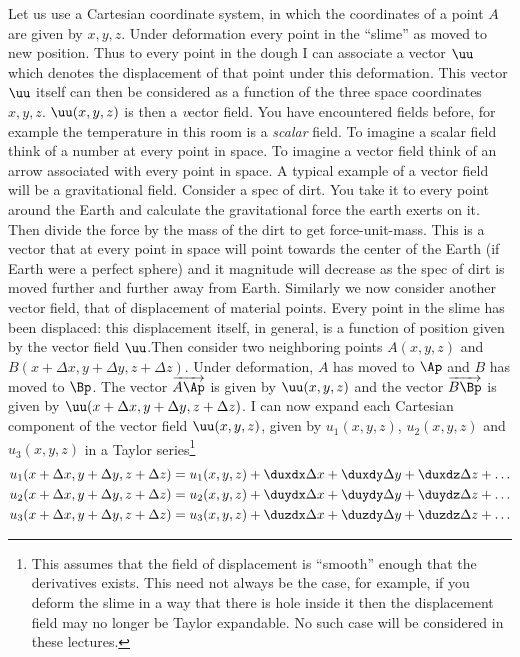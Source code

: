 \documentclass{tufte-book} %
\begin{document}
Let us use a Cartesian coordinate system, in which the coordinates of 
a point $A$ are given by $x,y,z$. Under deformation every point in the
``slime'' as moved to new position. Thus to every point in the dough I
can associate a vector $\uu$ which denotes the displacement of that
point under this deformation. This vector $\uu$ itself can then be
considered as a function of the three space coordinates
$x,y,z$. $\uu(x,y,z)$ is then a {\textit vector field}. 
You have encountered fields before, for example the temperature in
this room is a {\it scalar} field.  To imagine a scalar field think of
a number at every point in space. To imagine a vector field think of
an arrow associated with every point in space. A typical example of a
vector field will be a gravitational field. Consider a spec of
dirt. You take it to every point around the Earth and calculate the
gravitational force the earth exerts on it. Then divide the force by
the mass of the dirt to get force-unit-mass. This is a vector that at
every point in space will point towards the center of the Earth (if
Earth were a perfect sphere) and it magnitude will decrease as the spec
of dirt is moved further and further away from Earth. Similarly we now
consider another vector field, that of displacement of material
points. Every point in the slime has been displaced: this displacement
itself, in general, is a function of position given by the vector field
$\uu$.Then consider two neighboring points $A(x,y,z)$ and
$B(x+\Delta x, y+\Delta y, z+\Delta z)$. Under deformation, $A$ has
moved to $\Ap$ and $B$ has moved to $\Bp$. The vector $\overrightarrow{A\Ap}$ is given
by $\uu(x,y,z)$ and the vector $\overrightarrow{B\Bp}$ is given by $\uu(x+\Delta x,
y+\Delta y, z+\Delta z)$.  I can now expand each Cartesian component of the
vector field $\uu(x,y,z)$, given by $u_1(x,y,z)$, $u_2(x,y,z)$ and
$u_3(x,y,z)$ in a Taylor series\footnote{ This assumes that the field
  of displacement is ``smooth'' enough that the derivatives
  exists. This need not always be the case, for example,  if
  you deform the slime in a way that there is hole inside it then 
the displacement field may no longer be Taylor expandable. No such
case will be considered in these lectures. }
\begin{subequations}
\begin{align}
u_1(x+\Delta x, y+\Delta y, z+\Delta z) &= u_1(x,y,z) + \duxdx\Delta x
  + \duxdy \Delta y + \duxdz \Delta z + \ldots  \label{eq:ux}\\
u_2(x+\Delta x, y+\Delta y, z+\Delta z) &= u_2(x,y,z) + \duydx\Delta x
  + \duydy \Delta y + \duydz \Delta z + \ldots \label{eq:uy}\\
u_3(x+\Delta x, y+\Delta y, z+\Delta z) &= u_3(x,y,z) + \duzdx\Delta x
  + \duzdy \Delta y + \duzdz \Delta z + \ldots 
\end{align}
\label{eq:uu}
\end{subequations}
\end{document}
